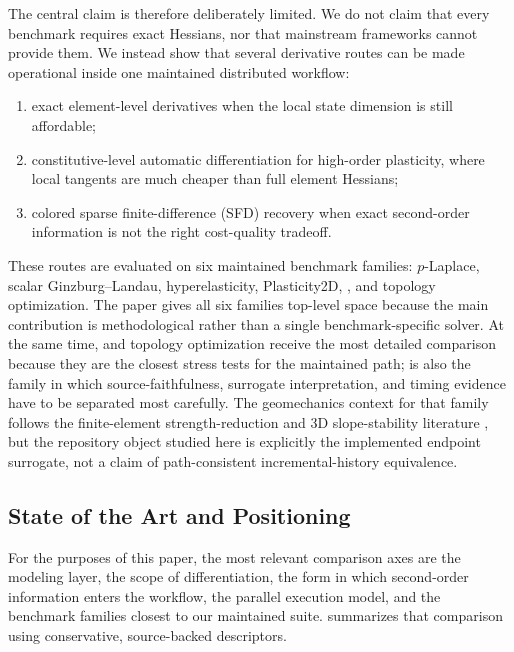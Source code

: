 The central claim is therefore deliberately limited. We do not claim that every
benchmark requires exact Hessians, nor that mainstream frameworks cannot provide
them. We instead show that several derivative routes can be made operational
inside one maintained distributed workflow:
\begin{enumerate}
  \item exact element-level derivatives when the local state dimension is still
        affordable;
  \item constitutive-level automatic differentiation for high-order plasticity,
        where local tangents are much cheaper than full element Hessians;
  \item colored sparse finite-difference (SFD) recovery when exact second-order
        information is not the right cost-quality tradeoff.
\end{enumerate}

These routes are evaluated on six maintained benchmark families:
$p$-Laplace, scalar Ginzburg--Landau, hyperelasticity, Plasticity2D,
\plasticitythree{}, and topology optimization. The paper gives all six families
top-level space because the main contribution is methodological rather than a
single benchmark-specific solver. At the same time, \plasticitythree{} and
topology optimization receive the most detailed comparison because they are the
closest stress tests for the maintained \jaxpetsc{} path; \plasticitythree{} is
also the family in which source-faithfulness, surrogate interpretation, and
timing evidence have to be separated most carefully. The geomechanics context
for that family follows the finite-element strength-reduction and 3D
slope-stability literature
\citep{tschuchnigg2015nonassociated,sysala2017returnmapping,sysala2021optimization,sysala2025convexoptimization,sysala2025advancedcontinuation},
but the repository object studied here is explicitly the implemented endpoint
surrogate, not a claim of path-consistent incremental-history equivalence.

\subsection{State of the Art and Positioning}
\label{sec:intro-sota}

For the purposes of this paper, the most relevant comparison axes are the
modeling layer, the scope of differentiation, the form in which second-order
information enters the workflow, the parallel execution model, and the benchmark
families closest to our maintained suite.  summarizes
that comparison using conservative, source-backed descriptors.

